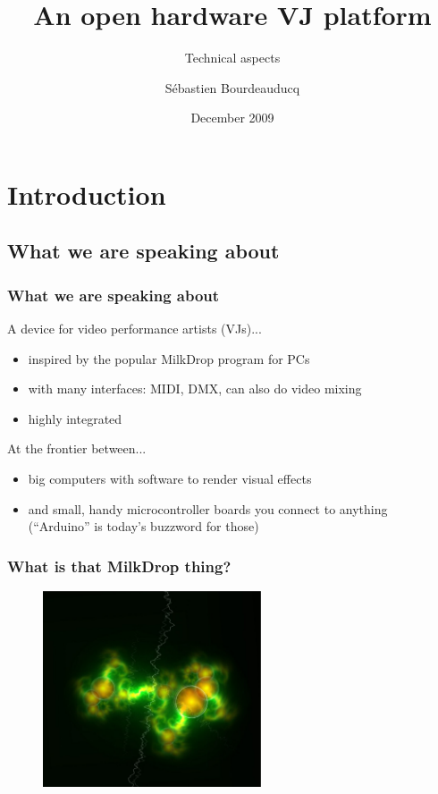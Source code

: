 \documentclass{beamer}
\title{An open hardware VJ platform}
\subtitle{Technical aspects}
\author{S\'ebastien Bourdeauducq}
\date{December 2009}
\begin{document}

\section{Introduction}
\subsection{What we are speaking about}
\frame
{
  \frametitle{What we are speaking about}
A device for video performance artists (VJs)...
  \begin{itemize}
  \item inspired by the popular MilkDrop program for PCs
  \item with many interfaces: MIDI, DMX, can also do video mixing
  \item highly integrated
  \end{itemize}

At the frontier between...
  \begin{itemize}
  \item big computers with software to render visual effects
  \item and small, handy microcontroller boards you connect to anything\\(``Arduino'' is today's buzzword for those)
  \end{itemize}
}

\frame
{
  \frametitle{What is that MilkDrop thing?}
  \begin{figure}[H]
  \includegraphics[height=58mm]{milkdrop1.eps}
  \end{figure}
}
\end{document}
